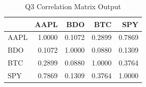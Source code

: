 \begin{table}[H]
\centering
\caption{Q3 Correlation Matrix Output}
\label{tab:q3}
\begin{tabular}{lrrrr}
\toprule
  & AAPL & BDO & BTC & SPY \\
\midrule
AAPL & 1.0000 & 0.1072 & 0.2899 & 0.7869 \\
BDO & 0.1072 & 1.0000 & 0.0880 & 0.1309 \\
BTC & 0.2899 & 0.0880 & 1.0000 & 0.3764 \\
SPY & 0.7869 & 0.1309 & 0.3764 & 1.0000 \\
\bottomrule
\end{tabular}
\end{table}
